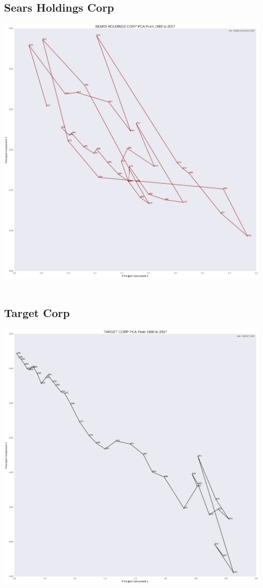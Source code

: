 \subsection{Sears Holdings Corp}
\includegraphics[width=1\textwidth]{./Sears}\\[0.1in] \\
\subsection{Target Corp}
\includegraphics[width=1\textwidth]{./Target}\\[0.1in] \\

